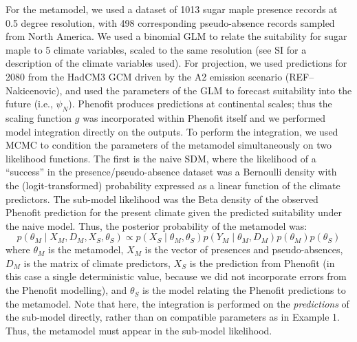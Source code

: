 For the metamodel, we used a dataset of 1013 sugar maple presence records at 0.5 degree resolution, with 498 corresponding pseudo-absence records sampled from North America.
We used a binomial GLM to relate the suitability for sugar maple to 5 climate variables, scaled to the same resolution (see SI for a description of the climate variables used).
For projection, we used predictions for 2080 from the HadCM3 GCM \citep{Pope2000} driven by the A2 emission scenario (REF--Nakicenovic), and used the parameters of the GLM to forecast suitability into the future (i.e., \(\psi_N\)).
Phenofit produces predictions at continental scales; thus the scaling function \(g\) was incorporated within Phenofit itself and we performed model integration directly on the outputs.
To perform the integration, we used \ac{MCMC} to condition the parameters of the metamodel simultaneously on two likelihood functions.
The first is the naive SDM, where the likelihood of a ``success'' in the presence/pseudo-absence dataset was a Bernoulli density with the (logit-transformed) probability expressed as a linear function of the climate predictors.
The sub-model likelihood was the Beta density of the observed Phenofit prediction for the present climate given the predicted suitability under the naive model. 
Thus, the posterior probability of the metamodel was:
\begin{equation}
\label{eq:integrated2}
	p( \theta_M \mid X_M, D_M, X_S, \theta_S )
	\propto 
	p( X_S \mid \theta_M, \theta_S )
	p( Y_M \mid \theta_M, D_M ) 
	p( \theta_M )
	p( \theta_S )
\end{equation}
where \(\theta_M\) is the metamodel, 
\(X_M\) is the vector of presences and pseudo-absences, 
\(D_M\) is the matrix of climate predictors,
\(X_S\) is the prediction from Phenofit (in this case a single deterministic value, because we did not incorporate errors from the Phenofit modelling),
and \(\theta_S\) is the model relating the Phenofit predictions to the metamodel.
Note that here, the integration is performed on the \emph{predictions} of the sub-model directly, rather than on compatible parameters as in Example 1. Thus, the metamodel must appear in the sub-model likelihood.

